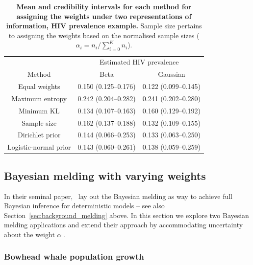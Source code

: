 \documentclass[a4paper, notitlepage, 10pt]{article}
\begin{document}
\begin{table}[ht]
\caption{\textbf{Mean and credibility intervals for each method for assigning the weights under two representations of information, HIV prevalence example.}
Sample size pertains to assigning the  weights based on the normalised sample sizes ($\alpha_i = n_i/ \sum_{i =0}^K n_i$).
}
\centering
\begin{tabular}{ccc}
 \hline
 & \multicolumn{2}{c}{Estimated HIV prevalence} \\
Method & Beta & Gaussian  \\ 
 \hline
 Equal weights &  0.150 (0.125--0.176)&  0.122 (0.099--0.145)\\ 
 Maximum entropy & 0.242 (0.204--0.282)  &  0.241 (0.202--0.280)\\ 
 Minimum KL  & 0.134 (0.107--0.163)  & 0.160 (0.129--0.192) \\ 
 Sample size & 0.162 (0.137--0.188) & 0.132 (0.109--0.155)\\
 Dirichlet prior & 0.144 (0.066--0.253) &  0.133 (0.063--0.250)\\ 
 Logistic-normal prior  & 0.143 (0.060--0.261) & 0.138 (0.059--0.259)\\ 
  \hline
\end{tabular}
\label{tab:prior_MSM}
\end{table}

\subsection{Bayesian melding with varying weights}
\label{sec:melding_apps}

In their seminal paper,~\cite{Poole2000} lay out the Bayesian melding as way to achieve full Bayesian inference for deterministic models -- see also Section~\ref{sec:background_melding} above.
In this section we explore two Bayesian melding applications and extend their approach by accommodating uncertainty about the weight $\alpha$ . 

\subsubsection{Bowhead whale population growth}
\label{sec:bowhead}
\end{document}
